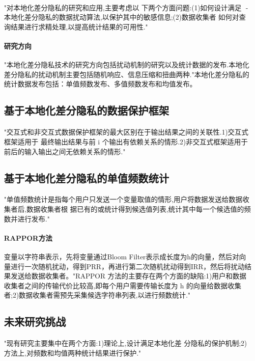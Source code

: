 \documentclass[12pt,a4paper]{article}
\begin{document}
\paragraph{} "对本地化差分隐私的研究和应用,主要考虑以 下两个方面问题:(1)如何设计满足 -本地化差分隐私的数据扰动算法,以保护其中的敏感信息;(2)数据收集者 如何对查询结果进行求精处理,以提高统计结果的可用性."
\paragraph{研究方向} "本地化差分隐私技术的研究方向包括扰动机制的研究以及统计数据的发布.本地化差分隐私的扰动机制主要包括随机响应、信息压缩和扭曲两种."本地化差分隐私的统计数据发布包括：单值频数发布、多值频数发布和均值发布。
\subsection{基于本地化差分隐私的数据保护框架}
\paragraph{} "交互式和非交互式数据保护框架的最大区别在于输出结果之间的关联性.1)交互式框架适用于 最终输出结果与前 i 个输出有依赖关系的情形.2)非交互式框架适用于前后的输入输出之间无依赖关系的情形."
\subsection{基于本地化差分隐私的单值频数统计}
\paragraph{} "单值频数统计是指每个用户只发送一个变量取值的情形,用户将数据发送给数据收集者后,数据收集者根 据已有的或统计得到候选值列表,统计其中每一个候选值的频数并进行发布."
\paragraph{RAPPOR方法} 变量以字符串表示，先将变量通过Bloom Filter表示成长度为h的向量，然后对向量进行一次随机扰动，得到PRR，再进行第二次随机扰动得到IRR，然后将扰动结果发送给数据收集者。"RAPPOR 方法的主要存在两个方面的缺陷:1)用户和数据收集者之间的传输代价比较高,即每个用户需要传输长度为 h 的向量给数据收集者;2)数据收集者需预先采集候选字符串列表,以进行频数统计."
\subsection{未来研究挑战} 
\paragraph{} "现有研究主要集中在两个方面:1)理论上,设计满足本地化差 分隐私的保护机制;2)方法上,对频数和均值两种统计结果进行保护."
\end{document}

